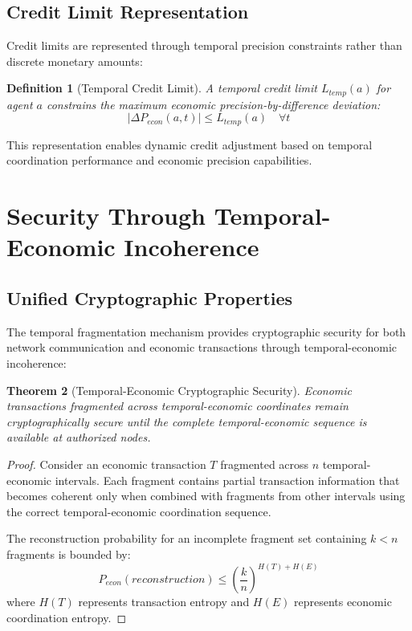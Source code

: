 \documentclass[12pt,a4paper]{article}
\newtheorem{theorem}{Theorem}[section]
\newtheorem{definition}[theorem]{Definition}
\begin{document}
\subsection{Credit Limit Representation}

Credit limits are represented through temporal precision constraints rather than discrete monetary amounts:

\begin{definition}[Temporal Credit Limit]
A temporal credit limit $L_{temp}(a)$ for agent $a$ constrains the maximum economic precision-by-difference deviation:
\begin{equation}
|\Delta P_{econ}(a,t)| \leq L_{temp}(a) \quad \forall t
\end{equation}
\end{definition}

This representation enables dynamic credit adjustment based on temporal coordination performance and economic precision capabilities.

\section{Security Through Temporal-Economic Incoherence}

\subsection{Unified Cryptographic Properties}

The temporal fragmentation mechanism provides cryptographic security for both network communication and economic transactions through temporal-economic incoherence:

\begin{theorem}[Temporal-Economic Cryptographic Security]
Economic transactions fragmented across temporal-economic coordinates remain cryptographically secure until the complete temporal-economic sequence is available at authorized nodes.
\end{theorem}

\begin{proof}
Consider an economic transaction $T$ fragmented across $n$ temporal-economic intervals. Each fragment contains partial transaction information that becomes coherent only when combined with fragments from other intervals using the correct temporal-economic coordination sequence.

The reconstruction probability for an incomplete fragment set containing $k < n$ fragments is bounded by:
\begin{equation}
P_{econ}(reconstruction) \leq \left(\frac{k}{n}\right)^{H(T) + H(E)}
\end{equation}
where $H(T)$ represents transaction entropy and $H(E)$ represents economic coordination entropy.
\end{proof}
\end{document}
